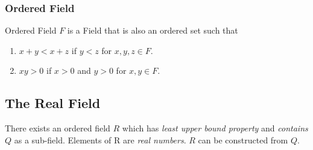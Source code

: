\documentclass{article}
\begin{document}
	  \subsubsection{Ordered Field}
	  Ordered Field $F$ is a Field that is also an ordered set such that 
	  \begin{enumerate}
	  	\item $x + y < x + z$ if $y < z$ for $x,y,z \in F$.
	  	\item $xy > 0$ if $x > 0$ and $y > 0$ for $x,y \in F$.
	  \end{enumerate}
	 
	\subsection{The Real Field}
	There exists an ordered field $R$ which has \emph{least upper bound property} and \emph{contains $Q$} as a sub-field. Elements of R are \emph{real numbers}.
	$R$ can be constructed from $Q$.
\end{document}
